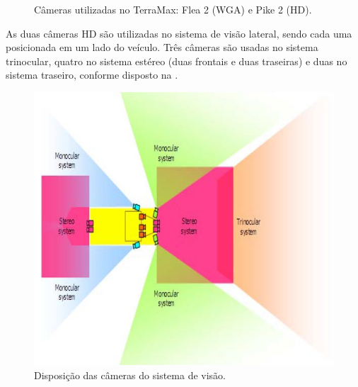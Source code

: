 \begin{figure}[h]
\centering
{}\qquad
{}
\caption{Câmeras utilizadas no TerraMax: Flea 2 (WGA) e Pike 2 (HD).}%
\label{fig:cameras}%
\end{figure}

As duas câmeras HD são utilizadas no sistema de visão lateral, sendo cada uma posicionada em um lado do veículo. Três câmeras são usadas no sistema trinocular, quatro no sistema estéreo (duas frontais e duas traseiras) e duas no sistema traseiro, conforme disposto na .

\begin{figure}[h]
\centering
\includegraphics[width=0.75\columnwidth]{figs/vision.jpg}
\caption{Disposição das câmeras do sistema de visão.}%
\label{fig:vision}%
\end{figure}

